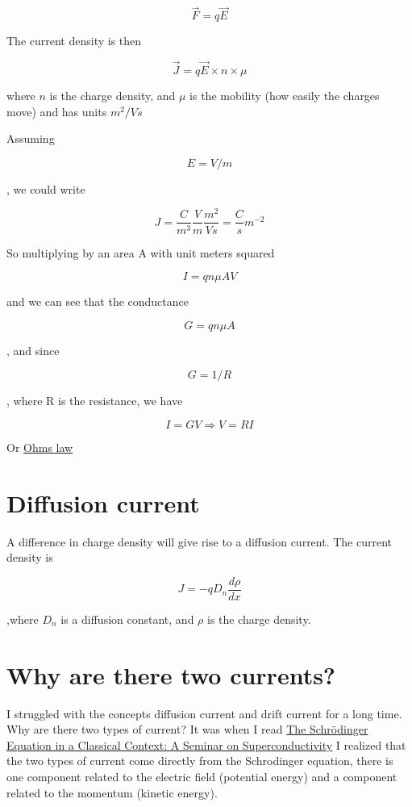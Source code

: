 \[\vec{F} = q\vec{E}\]

The current density is then

\[ \vec{J} = q\vec{E} \times n \times \mu \]

where \(n\) is the charge density, and \(\mu\) is the mobility (how
easily the charges move) and has units \(m^2/Vs\)

Assuming

\[ E = V/m\]

, we could write

\[ J = \frac{C}{m^3}\frac{V}{m}\frac{m^2}{Vs} = \frac{C}{s}m^{-2}\]

So multiplying by an area A with unit meters squared

\[ I = q n \mu A V\]

and we can see that the conductance

\[G = q n \mu A\]

, and since

\[G = 1/R\]

, where R is the resistance, we have

\[ I = G V \Rightarrow V = RI\]

Or \href{https://en.wikipedia.org/wiki/Ohm\%27s_law}{Ohms law}

\section{Diffusion current}\label{diffusion-current}

A difference in charge density will give rise to a diffusion current.
The current density is

\[ J = -q D_n \frac{d \rho}{dx}\]

,where \(D_n\) is a diffusion constant, and \(\rho\) is the charge
density.

\section{Why are there two currents?}\label{why-are-there-two-currents}

I struggled with the concepts diffusion current and drift current for a
long time. Why are there two types of current? It was when I read
\href{https://www.feynmanlectures.caltech.edu/III_21.html}{The
Schrödinger Equation in a Classical Context: A Seminar on
Superconductivity} I realized that the two types of current come
directly from the Schrodinger equation, there is one component related
to the electric field (potential energy) and a component related to the
momentum (kinetic energy).

